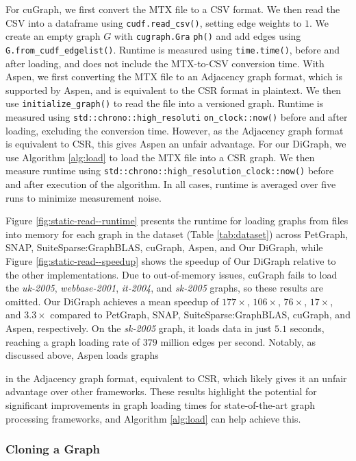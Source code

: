 For cuGraph, we first convert the MTX file to a CSV format. We then read the CSV into a dataframe using \texttt{cudf.read\_csv()}, setting edge weights to $1$. We create an empty graph $G$ with \texttt{cugraph.Gra} \texttt{ph()} and add edges using \texttt{G.from\_cudf\_edgelist()}. Runtime is measured using \texttt{time.time()}, before and after loading, and does not include the MTX-to-CSV conversion time. With Aspen, we first converting the MTX file to an Adjacency graph format, which is supported by Aspen, and is equivalent to the CSR format in plaintext. We then use \texttt{initialize\_graph()} to read the file into a versioned graph. Runtime is measured using \texttt{std::chrono::high\_resoluti} \texttt{on\_clock::now()} before and after loading, excluding the conversion time. However, as the Adjacency graph format is equivalent to CSR, this gives Aspen an unfair advantage. For our DiGraph, we use Algorithm \ref{alg:load} to load the MTX file into a CSR graph. We then measure runtime using \texttt{std::chrono::high\_resolution\_clock::now()} before and after execution of the algorithm. In all cases, runtime is averaged over five runs to minimize measurement noise.



Figure \ref{fig:static-read--runtime} presents the runtime for loading graphs from files into memory for each graph in the dataset (Table \ref{tab:dataset}) across PetGraph, SNAP, SuiteSparse:GraphBLAS, cuGraph, Aspen, and Our DiGraph, while Figure \ref{fig:static-read--speedup} shows the speedup of Our DiGraph relative to the other implementations. Due to out-of-memory issues, cuGraph fails to load the \textit{uk-2005}, \textit{webbase-2001}, \textit{it-2004}, and \textit{sk-2005} graphs, so these results are omitted. Our DiGraph achieves a mean speedup of $177\times$, $106\times$, $76\times$, $17\times$, and $3.3\times$ compared to PetGraph, SNAP, SuiteSparse:GraphBLAS, cuGraph, and Aspen, respectively. On the \textit{sk-2005} graph, it loads data in just $5.1$ seconds, reaching a graph loading rate of $379$ million edges per second. Notably, as discussed above, Aspen loads graphs in the Adjacency graph format, equivalent to CSR, which likely gives it an unfair advantage over other frameworks. These results highlight the potential for significant improvements in graph loading times for state-of-the-art graph processing frameworks, and Algorithm \ref{alg:load} can help achieve this.


\subsubsection{Cloning a Graph}

